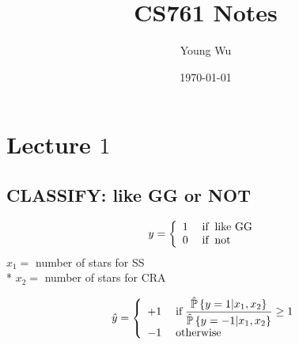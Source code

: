 \documentclass{article}
\title{CS761 Notes}
\author{Young Wu}
\date{\today}
\begin{document}
\newtheorem{thm}{Theorem}
\newtheorem{cor}{Corollary}
\newtheorem{lem}{Lemma}
\newtheorem{prop}{Proposition}
\newtheorem{conj}{Conjecture}
\newtheorem{algo}{Algorithm}
\newtheorem{obs}{Observation}
\newtheorem{clm}{Claim}
\theoremstyle{definition}
\newtheorem{df}{Definition}
\newtheorem{eg}{Example}
\newtheorem{asm}{Assumption}
\newtheorem{cond}{Condition}
\theoremstyle{remark}
\newtheorem{rmk}{Remark}
\maketitle \onehalfspacing \allowdisplaybreaks \raggedbottom


\section{Lecture $1$} 


\subsection{CLASSIFY: like GG or NOT}

\[ y =\left\{ \begin{array}{ll}
1& \text{\;if\;} \text{\;like GG\;} \\
0& \text{\;if\;} \text{\;not\;} \\
\end{array}\right. \]
$x_{1} =$ number of stars for SS
\\* $x_{2} =$ number of stars for CRA

\[ \hat{y} =\left\{ \begin{array}{ll}
+1& \text{\;if\;} \dfrac{\hat{\mathbb{P}}\left\{y = 1 | x_{1}, x_{2}\right\}}{\hat{\mathbb{P}}\left\{y = -1 | x_{1}, x_{2}\right\}} \geq  1 \\
-1& \text{\;otherwise\;} \\
\end{array}\right. \]
\end{document}
